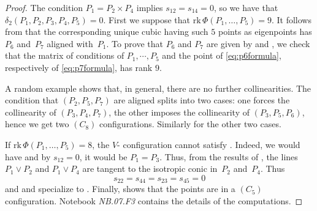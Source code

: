 \documentclass[a4paper, 11pt, reqno]{amsart}
\theoremstyle{plain}
\theoremstyle{definition}
\newcommand{\nb}[2]{\textsl{{NB}.{#1}.{#2}}}
\newcommand{\rk}{\ensuremath{\mathrm{rk}}}
\begin{document}
%
\begin{proof}
The condition $P_1 = P_2 \times P_4$ implies $s_{12}=s_{14}=0$,
so we have that $\delta_2 (P_1,P_2,P_3,P_4,P_5)=0$. 
First we suppose that $\rk \, \Phi(P_1, \dotsc, P_5) = 9$.
It follows from  that the corresponding unique cubic having such $5$ points as eigenpoints has $P_6$ and~$P_7$ aligned with~$P_1$.
To prove that $P_6$ and $P_7$ are given by  and ,
we check that the matrix of conditions of $P_1,\cdots, P_5$ and the point of
\eqref{eq:p6formula}, respectively of \eqref{eq:p7formula}, has rank $9$. 





A random example shows that, in general, there are no further collinearities.
The condition that $(P_2, P_5, P_7)$ are aligned splits into two cases:
one forces the collinearity of $(P_3, P_4, P_7)$, the other imposes the collinearity of $(P_3, P_5, P_6)$,
hence we get two $(C_8)$ configurations. Similarly for the other two cases. 

If $\rk \, \Phi(P_1, \dotsc, P_5) = 8$, the $V$- configuration cannot satisfy . Indeed, we would have  and by $s_{12} = 0$, it would be $P_1 = P_3$. Thus,
from the results of , the lines $P_1 \vee P_2$ and $P_1 \vee P_4$ are tangent to the isotropic conic in~$P_2$ and~$P_4$. Thus 
\[
s_{22}= s_{44}= s_{23}= s_{45}=0
\]
and  and  specialize to . Finally,  shows that the points are in a $(C_5)$ configuration. Notebook \nb{07}{F3} contains the details of the computations.
\end{proof}
%
\end{document}
